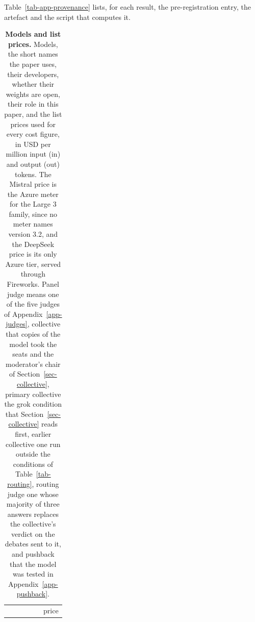 Table~\ref{tab-app-provenance} lists, for each result, the pre-registration
entry, the artefact and the script that computes it.

\begin{table}[t]
\centering
\footnotesize
\caption{\textbf{Models and list prices.} Models, the short names the paper uses, their developers, whether
their weights are open, their role in this paper, and the list prices used for
every cost figure, in USD per million input (in) and output (out) tokens. The Mistral price is the Azure meter for the Large 3
family, since no meter names version 3.2, and the DeepSeek price is its only
Azure tier, served through Fireworks. Panel judge means one of the five
judges of Appendix~\ref{app-judges}, collective that copies of the model took
the seats and the moderator's chair of Section~\ref{sec-collective}, primary
collective the grok condition that Section~\ref{sec-collective} reads first,
earlier collective one run outside the conditions of
Table~\ref{tab-routing}, routing judge one whose majority of three answers
replaces the collective's verdict on the debates sent to it, and pushback
that the model was tested in Appendix~\ref{app-pushback}.}
\label{tab-app-models}
{\setlength{\tabcolsep}{4pt}%
\begin{tabular}{llll>{\raggedright\arraybackslash}p{3.8cm}r@{.}lr@{.}l}
\toprule
 & & & & & \multicolumn{4}{c}{price} \\

\end{tabular}}
\end{table}
